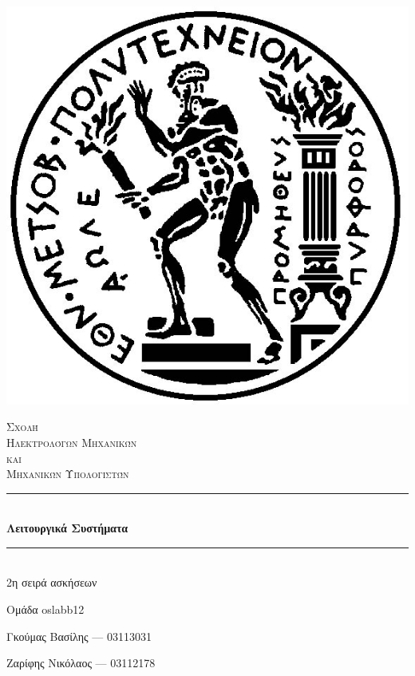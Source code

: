 \documentclass[12pt]{article}
\newcommand{\HRule}{\rule{\linewidth}{0.5mm}}
\begin{document}
\begin{titlepage}
\centering

\includegraphics[scale=0.3]{pyrforos.jpg}

\textsc{\LARGE Σχολή \\ Ηλεκτρολόγων Μηχανικών \\[-3pt] και \\[6pt] Μηχανικών Υπολογιστών}

\vspace{1cm}

\HRule \\[0.4cm]
{\huge \bfseries Λειτουργικά Συστήματα\\} %

\vspace{0.4cm}
\HRule \\[0.4cm]

\Large{2η σειρά ασκήσεων}



\vfill
\begin{center}
\large

Ομάδα \textlatin{oslabb12} 

Γκούμας Βασίλης ---  03113031 

Ζαρίφης Νικόλαος --- 03112178

\end{center}

\end{titlepage}
\end{document}
